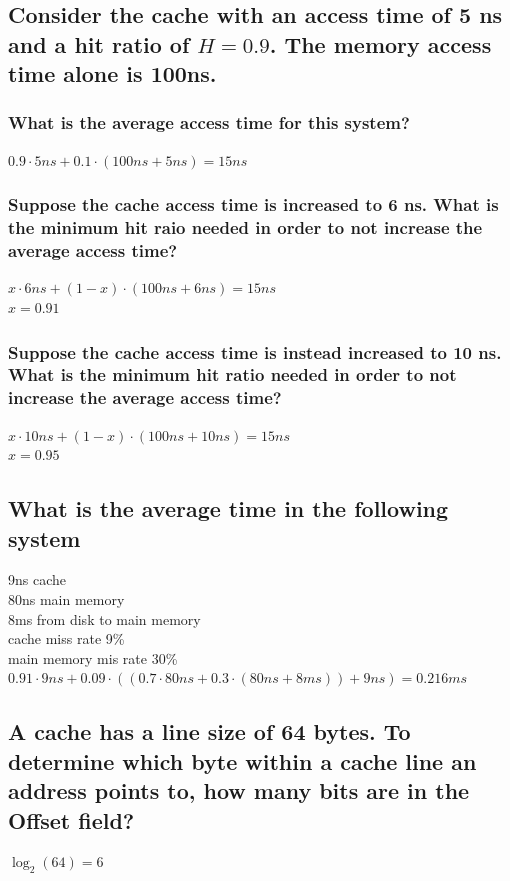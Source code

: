 \documentclass[12pt, a4paper]{article}
\begin{document}
		\subsection{Consider the cache with an access time of 5 ns and a hit ratio of $H=0.9$. The memory access time alone is 100ns.}
			\subsubsection{What is the average access time for this system?}
				$0.9\cdot 5 ns + 0.1 \cdot (100 ns + 5 ns) = 15 ns$
			\subsubsection{Suppose the cache access time is increased to 6 ns. What is the minimum hit raio needed in order to not increase the average access time?}
				$x\cdot 6 ns + (1-x)\cdot (100 ns + 6 ns) = 15 ns$\\
				$x=0.91$
			\subsubsection{Suppose the cache access time is instead increased to 10 ns. What is the minimum hit ratio needed in order to not increase the average access time?}
				$x\cdot 10 ns + (1-x)\cdot (100 ns + 10 ns) = 15 ns$\\
				$x=0.95$
		\subsection{What is the average time in the following system}
			9ns cache\\
			80ns  main memory\\
			8ms from disk to main memory\\
			cache miss rate 9\%\\
			main memory mis rate 30\%\\
			$0.91\cdot 9 ns + 0.09\cdot ((0.7 \cdot 80 ns + 0.3 \cdot (80 ns + 8 ms))+9ns)=0.216ms$ 
		\subsection{A cache has a line size of 64 bytes. To determine which byte within a cache line an address points to, how many bits are in the Offset field?}
			$\log_2(64)=6$
\end{document}
